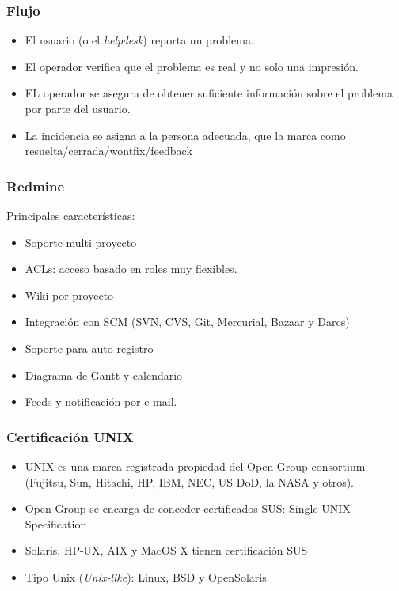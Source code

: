 \documentclass{beamer}
\begin{document}
\begin{frame}
\frametitle{Flujo}

\begin{itemize}
\item El usuario (o el \textit{helpdesk}) reporta un problema.
\item El operador verifica que el problema es real y no solo una impresión.
\item EL operador se asegura de obtener suficiente información sobre el problema por parte del usuario.
\item La incidencia se asigna a la persona adecuada, que la marca como resuelta/cerrada/wontfix/feedback

\end{itemize}
\end{frame}


\begin{frame}
\frametitle{Redmine}

Principales características:
\begin{itemize}
\item Soporte multi-proyecto
\item ACLs: acceso basado en roles muy flexibles. 
\item Wiki por proyecto
\item Integración con SCM (SVN, CVS, Git, Mercurial, Bazaar y Darcs)
\item Soporte para auto-registro
\item Diagrama de Gantt y calendario
\item Feeds y notificación por e-mail.
\end{itemize}
\end{frame}



\begin{frame}
\frametitle{Certificación UNIX}

\begin{itemize}
\item \textsc{UNIX}\texttrademark{} es una marca registrada propiedad del Open Group consortium (Fujitsu, Sun, Hitachi, HP, IBM, NEC, US DoD, la NASA y otros). 
\item Open Group se encarga de conceder certificados SUS: Single UNIX Specification 
\item Solaris, HP-UX, AIX y MacOS X tienen certificación SUS
\item Tipo Unix (\textit{Unix-like}): Linux, BSD y OpenSolaris
\end{itemize}
\end{frame}
\end{document}

